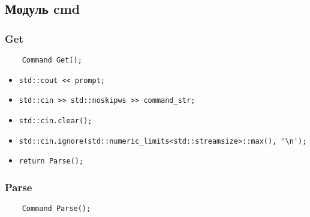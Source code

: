 \subsection*{Модуль cmd}


\subsubsection*{Get}

\begin{lstlisting}
	Command Get();
\end{lstlisting}

\begin{itemize}
	\item \verb|std::cout << prompt;|
	\item \verb|std::cin >> std::noskipws >> command_str;|
	\item \verb|std::cin.clear();|
	\item \verb|std::cin.ignore(std::numeric_limits<std::streamsize>::max(), '\n');|
	\item \verb|return Parse();|
\end{itemize}


\subsubsection*{Parse}

\begin{lstlisting}
	Command Parse();
\end{lstlisting}


